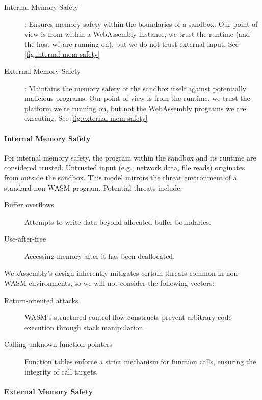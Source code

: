 \begin{description}
    \item[Internal Memory Safety]: Ensures memory safety within the boundaries of a sandbox.
    Our point of view is from within a WebAssembly instance, we trust the runtime (and the host we are running on), but we do not trust external input.
    See \cref{fig:internal-mem-safety}
    \item[External Memory Safety]: Maintains the memory safety of the sandbox itself against potentially malicious programs.
    Our point of view is from the runtime, we trust the platform we're running on, but not the WebAssembly programs we are executing.
    See \cref{fig:external-mem-safety}
\end{description}

\paragraph{Internal Memory Safety}
For internal memory safety, the program within the sandbox and its runtime are considered trusted.
Untrusted input (e.g., network data, file reads) originates from outside the sandbox.
This model mirrors the threat environment of a standard non-\ac{WASM} program.
Potential threats include:

\begin{description}
    \item[Buffer overflows] Attempts to write data beyond allocated buffer boundaries.
    \item[Use-after-free] Accessing memory after it has been deallocated.
\end{description}

WebAssembly's design inherently mitigates certain threats common in non-WASM environments, so we will not consider the following vectors:

\begin{description}
    \item[Return-oriented attacks] WASM's structured control flow constructs prevent arbitrary code execution through stack manipulation.
    \item[Calling unknown function pointers] Function tables enforce a strict mechanism for function calls, ensuring the integrity of call targets.
\end{description}

\paragraph{External Memory Safety}

